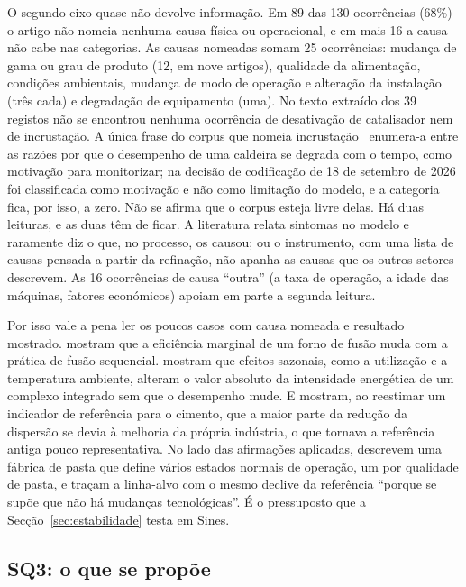 O segundo eixo quase não devolve informação. Em 89 das 130 ocorrências
(68\%) o artigo não nomeia nenhuma causa física ou operacional, e em mais 16
a causa não cabe nas categorias. As causas nomeadas somam 25 ocorrências:
mudança de gama ou grau de produto (12, em nove artigos), qualidade da
alimentação, condições ambientais, mudança de modo de operação e alteração
da instalação (três cada) e degradação de equipamento (uma). No texto
extraído dos 39 registos não se encontrou nenhuma ocorrência de desativação
de catalisador nem de incrustação. A única frase do corpus que nomeia
incrustação~\cite{Morales2018} enumera-a entre as razões por que o
desempenho de uma caldeira se degrada com o tempo, como motivação para
monitorizar; na decisão de codificação de 18 de setembro de 2026 foi
classificada como motivação e não como limitação do modelo, e a categoria
fica, por isso, a zero. Não se afirma
que o corpus esteja livre delas. Há duas leituras, e as duas têm de ficar. A literatura
relata sintomas no modelo e raramente diz o que, no processo, os causou; ou
o instrumento, com uma lista de causas pensada a partir da refinação, não
apanha as causas que os outros setores descrevem. As 16 ocorrências de causa
``outra'' (a taxa de operação, a idade das máquinas, fatores económicos)
apoiam em parte a segunda leitura.

Por isso vale a pena ler os poucos casos com causa nomeada e resultado
mostrado. \textcite{Giacone2012} mostram que a eficiência marginal de um
forno de fusão muda com a prática de fusão sequencial.
\textcite{Beisheim2020} mostram que efeitos sazonais, como a utilização e a
temperatura ambiente, alteram o valor absoluto da intensidade energética de
um complexo integrado sem que o desempenho mude. E \textcite{Boyd2013}
mostram, ao reestimar um indicador de referência para o cimento, que a maior
parte da redução da dispersão se devia à melhoria da própria indústria, o
que tornava a referência antiga pouco representativa. No lado das afirmações
aplicadas, \textcite{Andersson2021} descrevem uma fábrica de pasta que define
vários estados normais de operação, um por qualidade de pasta, e
\textcite{Gonzalez2012} traçam a linha-alvo com o mesmo declive da referência
``porque se supõe que não há mudanças tecnológicas''. É o pressuposto que a
Secção~\ref{sec:estabilidade} testa em Sines.

\subsection{SQ3: o que se propõe}
\label{sec:b-adaptacoes}

